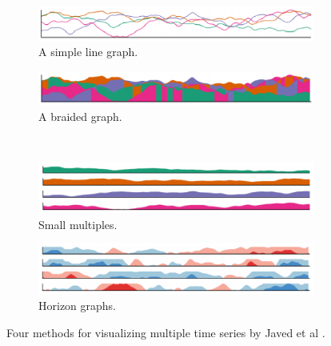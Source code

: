 \documentclass{article}
\begin{document}
\begin{figure}
	\centering
	\begin{subfigure}[b]{0.45\textwidth}
		\includegraphics[width=\textwidth]{figures/ts_simplelinegraph.eps}
		\caption{A simple line graph.}
		\label{fig:ts_simple}
	\end{subfigure}
	\begin{subfigure}[b]{0.45\textwidth}
		\includegraphics[width=\textwidth]{figures/ts_braidedgraph.eps}
		\caption{A braided graph.}
		\label{fig:ts_braid}
	\end{subfigure}
	\\
	\begin{subfigure}[b]{0.45\textwidth}
		\includegraphics[width=\textwidth]{figures/ts_smallmultiples.eps}
		\caption{Small multiples.}
		\label{fig:ts_smmult}
	\end{subfigure}
	\begin{subfigure}[b]{0.45\textwidth}
		\includegraphics[width=\textwidth]{figures/ts_horizongraphs.eps}
		\caption{Horizon graphs.}
		\label{fig:ts_horizon}
	\end{subfigure}
	\caption{Four methods for visualizing multiple time series by Javed et al \cite{Javed:2010:GPM:1907651.1907971}.}
	\label{fig:ts_compare}
\end{figure}
\end{document}

